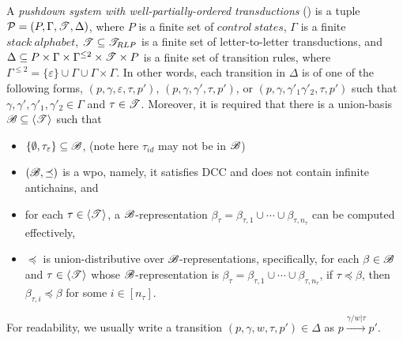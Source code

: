 \begin{definition}[\WOTrPDS] \label{def:defatpds}
    A \emph{pushdown system with well-partially-ordered transductions} (\WOTrPDS) is a tuple ${\mathcal{P} } = (P, \Gamma, {\mathscr{T} }, \Delta)$, 
    where $P$ is a finite set of $control\ states$, $\Gamma$ is a finite $stack\ alphabet$, ${\mathscr{T} } \subseteq {\mathscr{T}_{RLP} }$ is a finite set of letter-to-letter transductions, and $\Delta \subseteq P \times \Gamma \times \Gamma^{\le 2} \times {\mathscr{T} } \times P$ is a finite set of transition rules, where $\Gamma^{\le 2} = \{\varepsilon\} \cup \Gamma \cup \Gamma \times \Gamma$. In other words, each transition in $\Delta$ is of one of the following forms, $(p, \gamma, \varepsilon, \tau, p')$, $(p, \gamma, \gamma',\tau, p')$, or $(p, \gamma, \gamma'_1 \gamma'_2, \tau, p')$ such that $\gamma, \gamma', \gamma'_1, \gamma'_2 \in \Gamma$ and $\tau \in {\mathscr{T} }$. 
   Moreover, it is required that there is a union-basis ${\mathscr{B} } \subseteq \langle {\mathscr{T} } \rangle$ such that 
   \begin{itemize}
   \item $\{\emptyset, \tau_{\varepsilon}\} \subseteq {\mathscr{B} }$,  (note here $\tau_{id}$ may not be in ${\mathscr{B} }$)
   \item  $({\mathscr{B} }, \preceq)$ is a wpo, namely, it satisfies DCC and does not contain infinite antichains, and
%
   \item for each $\tau \in \langle {\mathscr{T} } \rangle$, a ${\mathscr{B} }$-representation $\beta_\tau = \beta_{\tau, 1} \cup \cdots \cup \beta_{\tau, n_\tau}$ can be computed effectively, 
%
   \item $\preceq$ is union-distributive over ${\mathscr{B} }$-representations, specifically, for each $\beta \in {\mathscr{B} }$ and $\tau \in \langle {\mathscr{T} } \rangle$ whose ${\mathscr{B} }$-representation is $\beta_\tau=\beta_{\tau, 1} \cup \cdots \cup \beta_{\tau, n_\tau}$, if $\tau \preceq \beta$, then $ \beta_{\tau, i} \preceq \beta$ for some $i \in [n_\tau]$.
\end{itemize}
\end{definition}
For readability, we usually write a transition $(p, \gamma, w, \tau, p') \in \Delta$ as $p \xrightarrow{\gamma/w | \tau} p'$.

